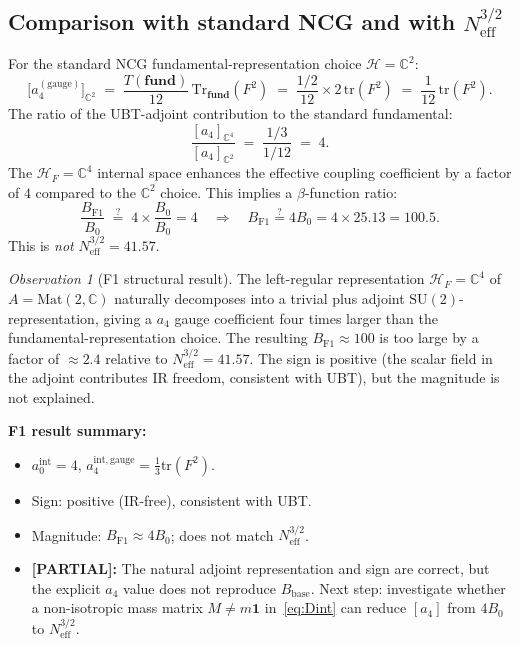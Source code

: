\documentclass[11pt,a4paper]{article}
\theoremstyle{definition}
\theoremstyle{remark}
\newtheorem{observation}{Observation}
\begin{document}
\subsection{Comparison with standard NCG and with $N_{\mathrm{eff}}^{3/2}$}

For the standard NCG fundamental-representation choice
$\mathcal{H} = \mathbb{C}^2$:
\begin{equation}
  \bigl[a_4^{(\mathrm{gauge})}\bigr]_{\mathbb{C}^2}
  \;=\; \frac{T(\mathbf{fund})}{12}\,\mathrm{Tr}_{\mathbf{fund}}(F^2)
  \;=\; \frac{1/2}{12} \times 2\,\mathrm{tr}(F^2)
  \;=\; \frac{1}{12}\,\mathrm{tr}(F^2).
  \label{eq:a4fund}
\end{equation}
The ratio of the UBT-adjoint contribution to the standard fundamental:
\begin{equation}
  \frac{[a_4]_{\mathbb{C}^4}}{[a_4]_{\mathbb{C}^2}}
  \;=\; \frac{1/3}{1/12} \;=\; 4.
  \label{eq:ratio_F1}
\end{equation}
The $\mathcal{H}_F = \mathbb{C}^4$ internal space enhances the effective
coupling coefficient by a factor of $4$ compared to the $\mathbb{C}^2$
choice.
This implies a $\beta$-function ratio:
\begin{equation}
  \frac{B_{\mathrm{F1}}}{B_0}
  \;\stackrel{?}{=}\; 4 \times \frac{B_0}{B_0} = 4
  \quad\Rightarrow\quad
  B_{\mathrm{F1}} \stackrel{?}{=} 4 B_0 = 4 \times 25.13 = 100.5.
  \label{eq:B_F1_wrong}
\end{equation}
This is \emph{not} $N_{\mathrm{eff}}^{3/2} = 41.57$.

\begin{observation}[F1 structural result]
  \label{obs:F1}
  The left-regular representation $\mathcal{H}_F = \mathbb{C}^4$ of
  $A = \mathrm{Mat}(2,\mathbb{C})$ naturally decomposes into a trivial
  plus adjoint $\mathrm{SU}(2)$-representation, giving a $a_4$ gauge
  coefficient four times larger than the fundamental-representation choice.
  The resulting $B_{\mathrm{F1}} \approx 100$ is too large by a factor
  of $\approx 2.4$ relative to $N_{\mathrm{eff}}^{3/2} = 41.57$.
  The sign is positive (the scalar field in the adjoint contributes IR freedom,
  consistent with UBT), but the magnitude is not explained.
\end{observation}

\textbf{F1 result summary:}
\begin{itemize}
  \item $a_0^{\mathrm{int}} = 4$, $a_4^{\mathrm{int, gauge}} = \frac{1}{3}\mathrm{tr}(F^2)$.
  \item Sign: positive (IR-free), consistent with UBT.
  \item Magnitude: $B_{\mathrm{F1}} \approx 4 B_0$; does not match
    $N_{\mathrm{eff}}^{3/2}$.
  \item \textbf{[PARTIAL]:} The natural adjoint representation and sign are correct,
    but the explicit $a_4$ value does not reproduce $B_{\mathrm{base}}$.
    Next step: investigate whether a non-isotropic mass matrix $M \neq m\mathbf{1}$
    in~\eqref{eq:Dint} can reduce $[a_4]$ from $4B_0$ to $N_{\mathrm{eff}}^{3/2}$.
\end{itemize}
\end{document}
